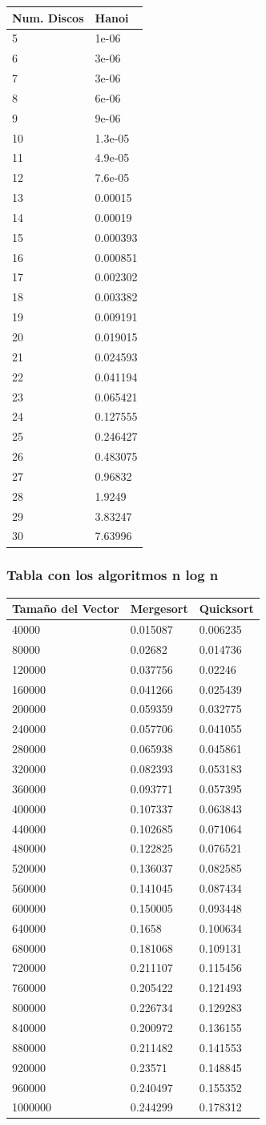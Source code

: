 \documentclass[]{article}
\begin{document}
\begin{longtable}[c]{@{}ll@{}}
\toprule
Num. Discos & Hanoi\tabularnewline
\midrule
\endhead
5 & 1e-06\tabularnewline
6 & 3e-06\tabularnewline
7 & 3e-06\tabularnewline
8 & 6e-06\tabularnewline
9 & 9e-06\tabularnewline
10 & 1.3e-05\tabularnewline
11 & 4.9e-05\tabularnewline
12 & 7.6e-05\tabularnewline
13 & 0.00015\tabularnewline
14 & 0.00019\tabularnewline
15 & 0.000393\tabularnewline
16 & 0.000851\tabularnewline
17 & 0.002302\tabularnewline
18 & 0.003382\tabularnewline
19 & 0.009191\tabularnewline
20 & 0.019015\tabularnewline
21 & 0.024593\tabularnewline
22 & 0.041194\tabularnewline
23 & 0.065421\tabularnewline
24 & 0.127555\tabularnewline
25 & 0.246427\tabularnewline
26 & 0.483075\tabularnewline
27 & 0.96832\tabularnewline
28 & 1.9249\tabularnewline
29 & 3.83247\tabularnewline
30 & 7.63996\tabularnewline
\bottomrule
\end{longtable}

\subsubsection{Tabla con los algoritmos n log
n}\label{tabla-con-los-algoritmos-n-log-n}

\begin{longtable}[c]{@{}lll@{}}
\toprule
Tamaño del Vector & Mergesort & Quicksort\tabularnewline
\midrule
\endhead
40000 & 0.015087 & 0.006235\tabularnewline
80000 & 0.02682 & 0.014736\tabularnewline
120000 & 0.037756 & 0.02246\tabularnewline
160000 & 0.041266 & 0.025439\tabularnewline
200000 & 0.059359 & 0.032775\tabularnewline
240000 & 0.057706 & 0.041055\tabularnewline
280000 & 0.065938 & 0.045861\tabularnewline
320000 & 0.082393 & 0.053183\tabularnewline
360000 & 0.093771 & 0.057395\tabularnewline
400000 & 0.107337 & 0.063843\tabularnewline
440000 & 0.102685 & 0.071064\tabularnewline
480000 & 0.122825 & 0.076521\tabularnewline
520000 & 0.136037 & 0.082585\tabularnewline
560000 & 0.141045 & 0.087434\tabularnewline
600000 & 0.150005 & 0.093448\tabularnewline
640000 & 0.1658 & 0.100634\tabularnewline
680000 & 0.181068 & 0.109131\tabularnewline
720000 & 0.211107 & 0.115456\tabularnewline
760000 & 0.205422 & 0.121493\tabularnewline
800000 & 0.226734 & 0.129283\tabularnewline
840000 & 0.200972 & 0.136155\tabularnewline
880000 & 0.211482 & 0.141553\tabularnewline
920000 & 0.23571 & 0.148845\tabularnewline
960000 & 0.240497 & 0.155352\tabularnewline
1000000 & 0.244299 & 0.178312\tabularnewline
\bottomrule
\end{longtable}
\end{document}
